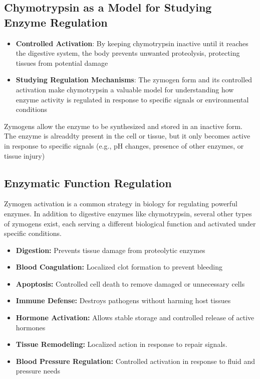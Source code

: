 \documentclass[10pt]{article}
\begin{document}
\subsection*{Chymotrypsin as a Model for Studying Enzyme Regulation}
\begin{itemize}
	\item \textbf{Controlled Activation}: By keeping chymotrypsin inactive until it reaches the digestive system, the body prevents unwanted proteolysis, protecting tissues from potential damage
	\item \textbf{Studying Regulation Mechanisms}: The zymogen form and its controlled activation make chymotrypsin a valuable model for understanding how enzyme activity is regulated in response to specific signals or environmental conditions
\end{itemize}

Zymogens allow the enzyme to be synthesized and stored in an inactive form.  The enzyme is alreaddty present in the cell or tissue, but it only becomes active in response to specific signals (e.g., pH changes, presence of other enzymes, or tissue injury)

\subsection*{Enzymatic Function Regulation}
Zymogen activation is a common strategy in biology for regulating powerful enzymes.  In addition to digestive enzymes like chymotrypsin, several other types of zymogens exist, each serving a different biological function and activated under specific conditions.
\begin{itemize}
    \item \textbf{Digestion:} Prevents tissue damage from proteolytic enzymes
    \item \textbf{Blood Coagulation:} Localized clot formation to prevent bleeding
    \item \textbf{Apoptosis:} Controlled cell death to remove damaged or unnecessary cells
    \item \textbf{Immune Defense:} Destroys pathogens without harming host tissues
    \item \textbf{Hormone Activation:} Allows stable storage and controlled release of active hormones
    \item \textbf{Tissue Remodeling:} Localized action in response to repair signals.
	\item \textbf{Blood Pressure Regulation:} Controlled activation in response to fluid and pressure needs
\end{itemize}
\end{document}
